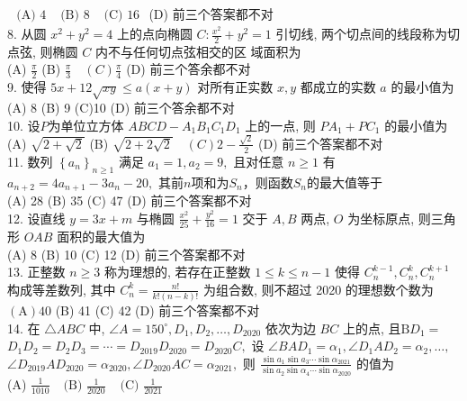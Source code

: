 $\begin{array}{lll}\text { (A) } 4 & \text { (B) } 8 & \text { (C) } 16\end{array}$
(D) 前三个答案都不对\\
8. 从圆 $x^{2}+y^{2}=4$ 上的点向椭圆 $C: \frac{x^{2}}{2}+y^{2}=1$ 引切线, 两个切点间的线段称为切点弦, 则椭圆 $C$ 内不与任何切点弦相交的区 域面积为\\
(A) $\frac{\pi}{2}$
(B) $\frac{\pi}{3} \quad(C) \frac{\pi}{4}$
(D) 前三个答余都不对\\
9. 使得 $5x+12 \sqrt{xy}\leq a(x+y)$ 对所有正实数 $x,y$ 都成立的实数 $a$ 的最小值为\\
(A) 8
(B) 9
(C)10
(D) 前三个答余都不对\\
10. 设$P$为单位立方体 $A B C D-A_{1} B_{1} C_{1} D_{1}$ 上的一点, 则 $P A_{1}+P C_{1}$ 的最小值为\\
(A) $\sqrt{2+\sqrt{2}}$
(B) $\sqrt{2+2 \sqrt{2}} \quad(C) 2-\frac{\sqrt{2}}{2}$
(D) 前三个答案都不对\\
11. 数列 $\left\{a_{n}\right\}_{n \geq 1}$ 满足 $a_{1}=1, a_{2}=9,$ 且对任意 $n \geq 1$ 有 $a_{n+2}=4 a_{n+1}-3 a_{n}-20,$ 其前$n$项和为$S_{n}$，则函数$S_{n}$的最大值等于\\
(A) 28
(B) 35
(C) 47
(D) 前三个答案都不对\\
12. 设直线 $y=3 x+m$ 与椭圆 $\frac{x^{2}}{25}+\frac{y^{2}}{16}=1$ 交于 $A, B$ 两点, $O$ 为坐标原点, 则三角形 $O A B$ 面积的最大值为\\
(A) 8
(B) 10
(C) 12
(D) 前三个答案都不对\\
13. 正整数 $n \geq 3$ 称为理想的, 若存在正整数 $1 \leq k \leq n-1$ 使得 $C_{n}^{k-1}, C_{n}^{k}, C_{n}^{k+1}$ 构成等差数列, 其中 $C_{n}^{k}=\frac{n !}{k !(n-k) !}$ 为组合数, 则不超过 2020 的理想数个数为\\
$(\mathrm{A}) 40$
(B) 41
(C) 42
(D) 前三个答案都不对\\
14. 在 $\triangle A B C$ 中, $\angle A=150^{\circ}, D_{1}, D_{2}, \ldots, D_{2020}$ 依次为边 $B C$ 上的点, 且$\mathrm B D_{1}=$
$D_{1} D_{2}=D_{2} D_{3}=\cdots=D_{2019} D_{2020}=D_{2020} C,$ 设 $\angle B A D_{1}=\alpha_{1}, \angle D_{1} A D_{2}=\alpha_{2}, \ldots,$
$\angle D_{2019} A D_{2020}=\alpha_{2020}, \angle D_{2020} A C=\alpha_{2021},$ 则 $\frac{\sin a_{1} \sin a_{3} \cdots \sin \alpha_{2021}}{\sin a_{2} \sin \alpha_{4} \cdots \sin \alpha_{2020}}$ 的值为\\
(A) $\frac{1}{1010}$
$\begin{array}{ll}\text { (B) } \frac{1}{2020} & \text { (C) } \frac{1}{2021}\end{array}$
